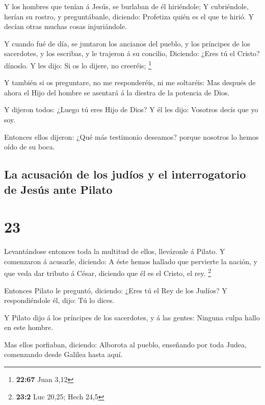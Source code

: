  Y los hombres que tenían á Jesús, se burlaban de él
hiriéndole;  Y cubriéndole, herían su rostro, y
preguntábanle, diciendo: Profetiza quién es el que te hirió.
 Y decían otras muchas cosas injuriándole.

 Y cuando fué de día, se juntaron los ancianos del pueblo,
y los príncipes de los sacerdotes, y los escribas, y le trajeron á su
concilio,  Diciendo: ¿Eres tú el Cristo? dínoslo. Y les
dijo: Si os lo dijere, no creeréis; \footnote{\textbf{22:67} Juan 3,12}

 Y también si os preguntare, no me responderéis, ni me
soltaréis:  Mas después de ahora el Hijo del hombre se
asentará á la diestra de la potencia de Dios.

 Y dijeron todos: ¿Luego tú eres Hijo de Dios? Y él les
dijo: Vosotros decís que yo soy.

 Entonces ellos dijeron: ¿Qué más testimonio deseamos?
porque nosotros lo hemos oído de su boca.

\hypertarget{la-acusaciuxf3n-de-los-juduxedos-y-el-interrogatorio-de-jesuxfas-ante-pilato}{%
\subsection{La acusación de los judíos y el interrogatorio de Jesús ante
Pilato}\label{la-acusaciuxf3n-de-los-juduxedos-y-el-interrogatorio-de-jesuxfas-ante-pilato}}

\hypertarget{section-22}{%
\section{23}\label{section-22}}

 Levantándose entonces toda la multitud de ellos, lleváronle
á Pilato.  Y comenzaron á acusarle, diciendo: A éste hemos
hallado que pervierte la nación, y que veda dar tributo á César,
diciendo que él es el Cristo, el rey. \footnote{\textbf{23:2} Luc 20,25;
  Hech 24,5}

 Entonces Pilato le preguntó, diciendo: ¿Eres tú el Rey de
los Judíos? Y respondiéndole él, dijo: Tú lo dices.

 Y Pilato dijo á los príncipes de los sacerdotes, y á las
gentes: Ninguna culpa hallo en este hombre.

 Mas ellos porfiaban, diciendo: Alborota al pueblo,
enseñando por toda Judea, comenzando desde Galilea hasta aquí.

